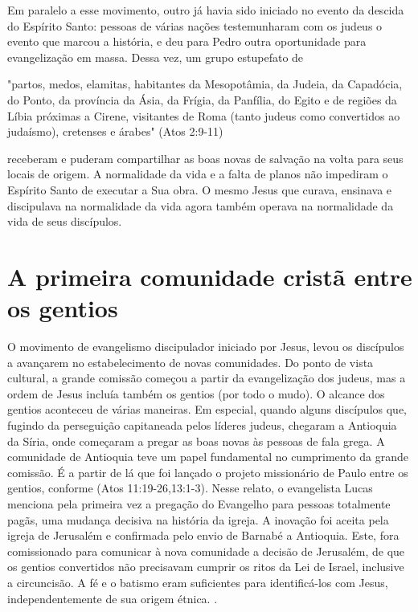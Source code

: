 \documentclass[12pt,openright,oneside,a4paper]{abntex2}
\begin{document}
Em paralelo a esse movimento, outro já havia sido iniciado no evento da descida do Espírito Santo: pessoas de várias nações testemunharam com os judeus o evento que marcou a história, e deu para Pedro outra oportunidade para evangelização em massa. Dessa vez, um grupo estupefato de 
\begin{citacao}"partos, medos, elamitas, habitantes da Mesopotâmia, da Judeia, da Capadócia, do Ponto, da província da Ásia, da Frígia, da Panfília, do Egito e de regiões da Líbia próximas a Cirene, visitantes de Roma (tanto judeus como convertidos ao judaísmo), cretenses e árabes" (Atos 2:9-11)\end{citacao} receberam e puderam compartilhar as boas novas de salvação na volta para seus locais de origem. A normalidade da vida e a falta de planos não impediram o Espírito Santo de executar a Sua obra. O mesmo Jesus que curava, ensinava e discipulava na normalidade da vida agora também operava na normalidade da vida de seus discípulos.

\section{A primeira comunidade cristã entre os gentios}

O movimento de evangelismo discipulador iniciado por Jesus, levou os discípulos a avançarem no estabelecimento de novas comunidades. Do ponto de vista cultural, a grande comissão começou a partir da evangelização dos judeus, mas a ordem de Jesus incluía também os gentios (por todo o mudo). O alcance dos gentios aconteceu de várias maneiras. Em especial, quando alguns discípulos que, fugindo da perseguição capitaneada pelos líderes judeus, chegaram a Antioquia da Síria, onde começaram a pregar as boas novas às pessoas de fala grega. A comunidade de Antioquia teve um papel fundamental no cumprimento da grande comissão. É a partir de lá que foi lançado o projeto missionário de Paulo entre os gentios, conforme (Atos 11:19-26,13:1-3). Nesse relato, o evangelista Lucas menciona pela primeira vez a pregação do Evangelho para pessoas totalmente pagãs, uma mudança decisiva na história da igreja. A inovação foi aceita pela igreja de Jerusalém e confirmada pelo envio de Barnabé a Antioquia. Este, fora comissionado para comunicar à nova comunidade a decisão de Jerusalém, de que os gentios convertidos não precisavam cumprir os ritos da Lei de Israel, inclusive a circuncisão. A fé e o batismo eram suficientes para identificá-los com Jesus, independentemente de sua origem étnica. \cite[p. 198]{green}.
\end{document}
